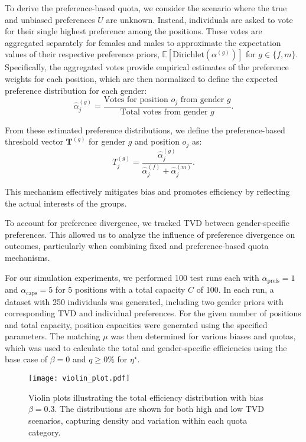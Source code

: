 \documentclass[letterpaper]{article}
\begin{document}
To derive the preference-based quota, we consider the scenario where the true and unbiased preferences \( U \) are unknown. Instead, individuals are asked to vote for their single highest preference among the positions. These votes are aggregated separately for females and males to approximate the expectation values of their respective preference priors, \( \mathbb{E}[\textrm{Dirichlet}(\alpha^{(g)})] \) for \( g \in \{f, m\} \). Specifically, the aggregated votes provide empirical estimates of the preference weights for each position, which are then normalized to define the expected preference distribution for each gender:
\[
\hat{\alpha}^{(g)}_j = \frac{\text{Votes for position } o_j \text{ from gender } g}{\text{Total votes from gender } g}.
\]

From these estimated preference distributions, we define the preference-based threshold vector \( \mathbf{T}^{(g)} \) for gender \( g \) and position \( o_j \) as:
\[
T_j^{(g)} = \frac{\hat{\alpha}^{(g)}_j}{\hat{\alpha}^{(f)}_j + \hat{\alpha}^{(m)}_j}.
\]

This mechanism effectively mitigates bias and promotes efficiency by reflecting the actual interests of the groups.

To account for preference divergence, we tracked TVD between gender-specific preferences. This allowed us to analyze the influence of preference divergence on outcomes, particularly when combining fixed and preference-based quota mechanisms.

For our simulation experiments, we performed 100 test runs each with \( \alpha_\text{prefs} = 1 \) and \( \alpha_\text{caps} = 5 \) for 5 positions with a total capacity \( C \) of 100. In each run, a dataset with 250 individuals was generated, including two gender priors with corresponding TVD and individual preferences. For the given number of positions and total capacity, position capacities were generated using the specified parameters. The matching \( \mu \) was then determined for various biases and quotas, which was used to calculate the total and gender-specific efficiencies using the base case of \( \beta = 0 \) and \( q \geq 0\% \) for \(\eta^{\star}\). 

\begin{figure}[ht]
  \centering
  \texttt{[image: violin\_plot.pdf]}
\caption{Violin plots illustrating the total efficiency distribution with bias \( \beta = 0.3 \). The distributions are shown for both high and low TVD scenarios, capturing density and variation within each quota category.}
  \label{fig:violin_plot}
\end{figure}
\end{document}
